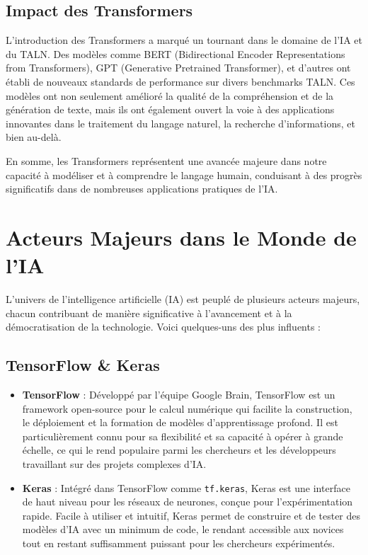 \documentclass[
  letterpaper,
  DIV=11,
  numbers=noendperiod]{scrreprt}
\begin{document}
\section{Impact des Transformers}\label{impact-des-transformers}

L'introduction des Transformers a marqué un tournant dans le domaine de
l'IA et du TALN. Des modèles comme BERT (Bidirectional Encoder
Representations from Transformers), GPT (Generative Pretrained
Transformer), et d'autres ont établi de nouveaux standards de
performance sur divers benchmarks TALN. Ces modèles ont non seulement
amélioré la qualité de la compréhension et de la génération de texte,
mais ils ont également ouvert la voie à des applications innovantes dans
le traitement du langage naturel, la recherche d'informations, et bien
au-delà.

En somme, les Transformers représentent une avancée majeure dans notre
capacité à modéliser et à comprendre le langage humain, conduisant à des
progrès significatifs dans de nombreuses applications pratiques de l'IA.


\chapter{Acteurs Majeurs dans le Monde de
l'IA}\label{acteurs-majeurs-dans-le-monde-de-lia}

L'univers de l'intelligence artificielle (IA) est peuplé de plusieurs
acteurs majeurs, chacun contribuant de manière significative à
l'avancement et à la démocratisation de la technologie. Voici
quelques-uns des plus influents :

\section{TensorFlow \& Keras}\label{tensorflow-keras}

\begin{itemize}
\item
  \textbf{TensorFlow} : Développé par l'équipe Google Brain, TensorFlow
  est un framework open-source pour le calcul numérique qui facilite la
  construction, le déploiement et la formation de modèles
  d'apprentissage profond. Il est particulièrement connu pour sa
  flexibilité et sa capacité à opérer à grande échelle, ce qui le rend
  populaire parmi les chercheurs et les développeurs travaillant sur des
  projets complexes d'IA.
\item
  \textbf{Keras} : Intégré dans TensorFlow comme \texttt{tf.keras},
  Keras est une interface de haut niveau pour les réseaux de neurones,
  conçue pour l'expérimentation rapide. Facile à utiliser et intuitif,
  Keras permet de construire et de tester des modèles d'IA avec un
  minimum de code, le rendant accessible aux novices tout en restant
  suffisamment puissant pour les chercheurs expérimentés.
\end{itemize}
\end{document}
